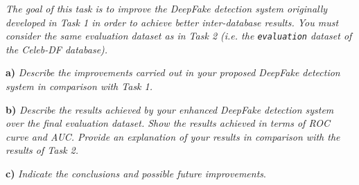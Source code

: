 \documentclass[11pt]{article}
\begin{document}
\textit{The goal of this task is to improve the DeepFake detection system originally developed in Task 1 in order to achieve better inter-database results. You must consider the same evaluation dataset as in Task 2 (i.e. the \texttt{evaluation} dataset of the Celeb-DF database).}

\textbf{a)} \textit{Describe the improvements carried out in your proposed DeepFake detection system in comparison with Task 1.}

\textbf{b)} \textit{Describe the results achieved by your enhanced DeepFake detection system over the final evaluation dataset. Show the results achieved in terms of ROC curve and AUC. Provide an explanation of your results in comparison with the results of Task 2.}

\textbf{c)} \textit{Indicate the conclusions and possible future improvements}.




\end{document}
